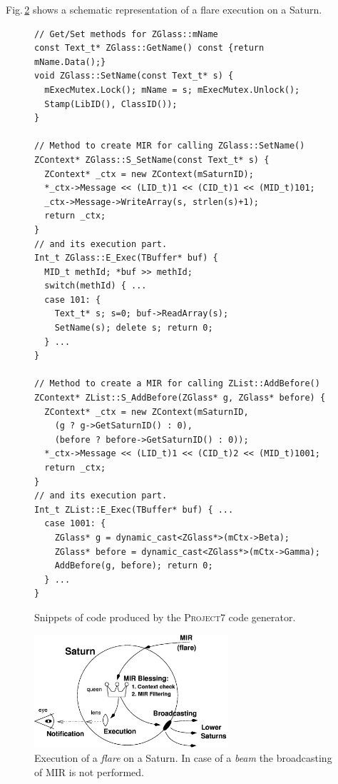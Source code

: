 \documentclass[final]{siamltex}
\def\p7{\textsc{Project7}\xspace}
\begin{document}
Fig.\,\ref{fig:flare_exec} shows a schematic representation of a flare
execution on a Saturn.

\begin{figure}
\centering
\scriptsize
\begin{verbatim}
// Get/Set methods for ZGlass::mName
const Text_t* ZGlass::GetName() const {return mName.Data();}
void ZGlass::SetName(const Text_t* s) {
  mExecMutex.Lock(); mName = s; mExecMutex.Unlock();
  Stamp(LibID(), ClassID());
}

// Method to create MIR for calling ZGlass::SetName()
ZContext* ZGlass::S_SetName(const Text_t* s) {
  ZContext* _ctx = new ZContext(mSaturnID);
  *_ctx->Message << (LID_t)1 << (CID_t)1 << (MID_t)101;
  _ctx->Message->WriteArray(s, strlen(s)+1);
  return _ctx;
}
// and its execution part.
Int_t ZGlass::E_Exec(TBuffer* buf) {
  MID_t methId; *buf >> methId;
  switch(methId) { ...
  case 101: {
    Text_t* s; s=0; buf->ReadArray(s);
    SetName(s); delete s; return 0;
  } ...
}

// Method to create a MIR for calling ZList::AddBefore()
ZContext* ZList::S_AddBefore(ZGlass* g, ZGlass* before) {
  ZContext* _ctx = new ZContext(mSaturnID,
    (g ? g->GetSaturnID() : 0),
    (before ? before->GetSaturnID() : 0));
  *_ctx->Message << (LID_t)1 << (CID_t)2 << (MID_t)1001;
  return _ctx;
}
// and its execution part.
Int_t ZList::E_Exec(TBuffer* buf) { ...
  case 1001: {
    ZGlass* g = dynamic_cast<ZGlass*>(mCtx->Beta);
    ZGlass* before = dynamic_cast<ZGlass*>(mCtx->Gamma);
    AddBefore(g, before); return 0;
  } ...
}
\end{verbatim}
  \caption{Snippets of code produced by the \p7 code generator.}
  \label{fig:p7_snip}
\end{figure}


\begin{figure}
  \centering
  \includegraphics[width=7.2cm]{figs/flare_exec}
  \caption{Execution of a \emph{flare} on a Saturn. In case of a
    \emph{beam} the broadcasting of MIR is not performed.}
  \label{fig:flare_exec}
\end{figure}
\end{document}
